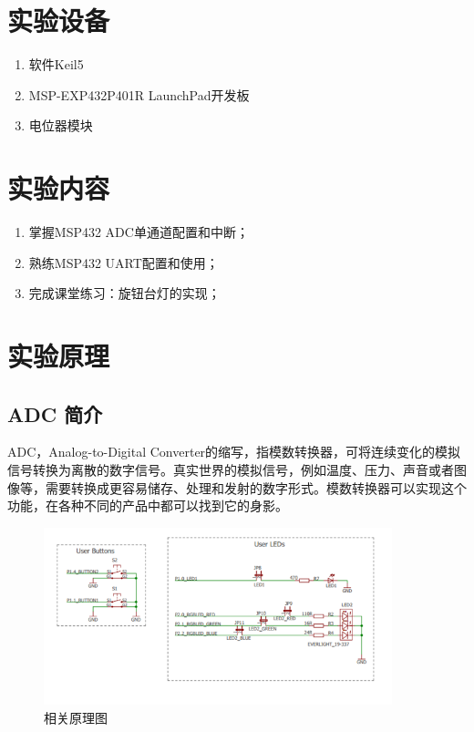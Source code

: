 \documentclass[a4paper,10pt,UTF8]{paper}
\numberwithin{equation}{section}
\numberwithin{figure}{section}
\begin{document}
\section{实验设备}

\begin{enumerate}
    \item 软件Keil5
    \item MSP-EXP432P401R LaunchPad开发板
    \item 电位器模块
\end{enumerate}


\section{实验内容}

\begin{enumerate}
    \item 掌握MSP432 ADC单通道配置和中断；
    \item 熟练MSP432 UART配置和使用；
    \item 完成课堂练习：旋钮台灯的实现；
\end{enumerate}

\section{实验原理}

\subsection{ADC 简介}

ADC，Analog-to-Digital Converter的缩写，指模数转换器，可将连续变化的模拟信号转换为离散的数字信号。真实世界的模拟信号，例如温度、压力、声音或者图像等，需要转换成更容易储存、处理和发射的数字形式。模数转换器可以实现这个功能，在各种不同的产品中都可以找到它的身影。

\begin{figure}[h]
    \centering
    \includegraphics[width=0.9\textwidth]{img/1.PNG}
    \caption{相关原理图}
    \label{fig:1}
\end{figure}
\end{document}
